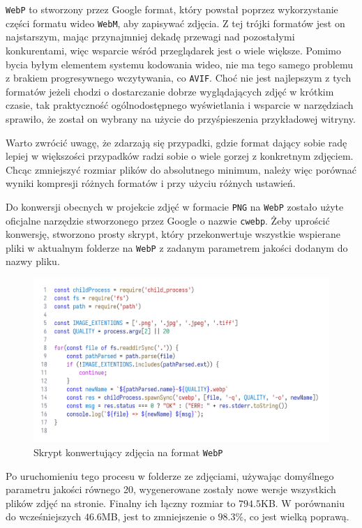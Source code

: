 \documentclass[licencjacka]{pracadypl}
\begin{document}
\texttt{WebP} to stworzony przez Google format, który powstał poprzez wykorzystanie części formatu wideo \texttt{WebM}, aby zapisywać zdjęcia. Z tej trójki formatów jest on najstarszym, mając przynajmniej dekadę przewagi nad pozostałymi konkurentami, więc wsparcie wśród przeglądarek jest o wiele większe. Pomimo bycia byłym elementem systemu kodowania wideo, nie ma tego samego problemu z brakiem progresywnego wczytywania, co \texttt{AVIF}. Choć nie jest najlepszym z tych formatów jeżeli chodzi o dostarczanie dobrze wyglądających zdjęć w krótkim czasie, tak praktyczność ogólnodostępnego wyświetlania i wsparcie w narzędziach sprawiło, że został on wybrany na użycie do przyśpieszenia przykładowej witryny.

Warto zwrócić uwagę, że zdarzają się przypadki, gdzie format dający sobie radę lepiej w większości przypadków radzi sobie o wiele gorzej z konkretnym zdjęciem. Chcąc zmniejszyć rozmiar plików do absolutnego minimum, należy więc porównać wyniki kompresji różnych formatów i przy użyciu różnych ustawień.

Do konwersji obecnych w projekcie zdjęć w formacie \texttt{PNG} na \texttt{WebP} zostało użyte oficjalne narzędzie stworzonego przez Google o nazwie \texttt{cwebp}. Żeby uprościć konwersję, stworzono prosty skrypt, który przekonwertuje wszystkie wspierane pliki w aktualnym folderze na \texttt{WebP} z zadanym parametrem jakości dodanym do nazwy pliku.

\begin{figure}[H]
  \includegraphics[width=\linewidth]{images/code_script_conv_webm.png}
  \caption{Skrypt konwertujący zdjęcia na format \texttt{WebP}}
  \label{fig:script-webp}
\end{figure}

Po uruchomieniu tego procesu w folderze ze zdjęciami, używając domyślnego parametru jakości równego 20, wygenerowane zostały nowe wersje wszystkich plików zdjęć na stronie. Finalny ich łączny rozmiar to $794.5$KB. W porównaniu do wcześniejszych $46.6$MB, jest to zmniejszenie o $98.3\%$, co jest wielką poprawą.
\end{document}

